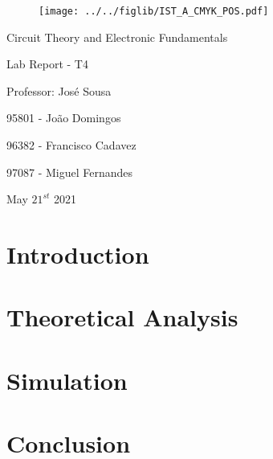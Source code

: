 \documentclass[11pt]{article}
\begin{document}
\thispagestyle{empty}
\begin{figure}[h]
	\centering
	\texttt{[image: ../../figlib/IST\_A\_CMYK\_POS.pdf]}
\end{figure}

\begin{center}
	\huge{Circuit Theory and Electronic Fundamentals}
	
	\huge{Lab Report - T4}
	
	\vspace{30pt}
	
	\large{Professor: José Sousa}
	
	\vspace{20pt}
	
	\large{95801 - João Domingos}
	
	\large{96382 - Francisco Cadavez}
	
	\large{97087 - Miguel Fernandes}
	
	\vspace{20pt}
	
	\large{May $21^{st}$ 2021}
\end{center}

\pagebreak
\tableofcontents

\pagebreak
\section{Introduction}


\pagebreak
\section{Theoretical Analysis}
\label{sec:theory}


\clearpage
\section{Simulation}


\pagebreak
\section{Conclusion}
\label{sec:conc}

\end{document}
